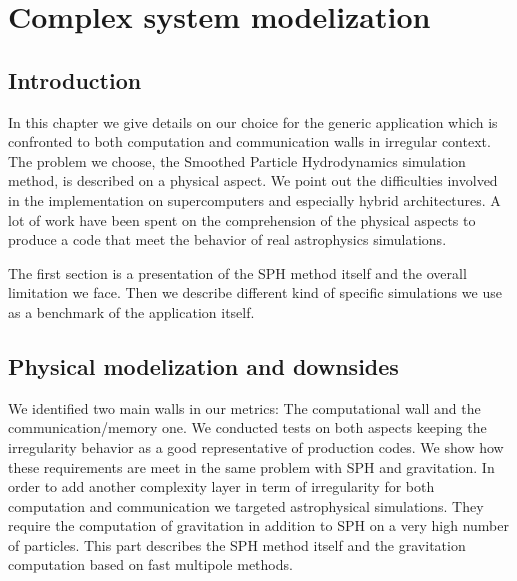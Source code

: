 \chapter{Complex system modelization}

\section{Introduction}
In this chapter we give details on our choice for the generic application which is confronted to both computation and communication walls in irregular context. 
The problem we choose, the Smoothed Particle Hydrodynamics simulation method, is described on a physical aspect.
We point out the difficulties involved in the implementation on supercomputers and especially hybrid architectures.  
A lot of work have been spent on the comprehension of the physical aspects to produce a code that meet the behavior of real astrophysics simulations.

The first section is a presentation of the SPH method itself and the overall limitation we face. 
Then we describe different kind of specific simulations we use as a benchmark of the application itself. 

\section{Physical modelization and downsides}
We identified two main walls in our metrics:
The computational wall and the communication/memory one.
We conducted tests on both aspects keeping the irregularity behavior as a good representative of production codes.
We show how these requirements are meet in the same problem with SPH and gravitation.
In order to add another complexity layer in term of irregularity for both computation and communication we targeted astrophysical simulations. 
They require the computation of gravitation in addition to SPH on a very high number of particles. 
This part describes the SPH method itself and the gravitation computation based on fast multipole methods. 

